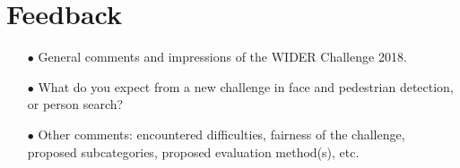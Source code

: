 \documentclass[runningheads]{llncs}
\begin{document}
\section{Feedback}
\begin{spacing}{1.5}
\begin{itemize}

\item[$\bullet$] General comments and impressions of the WIDER Challenge 2018.

\item[$\bullet$] What do you expect from a new challenge in face and pedestrian detection, or person search?

\item[$\bullet$] Other comments: encountered difficulties, fairness of the challenge, proposed subcategories, proposed evaluation method(s), etc.

\end{itemize}
\end{spacing}




\end{document}
